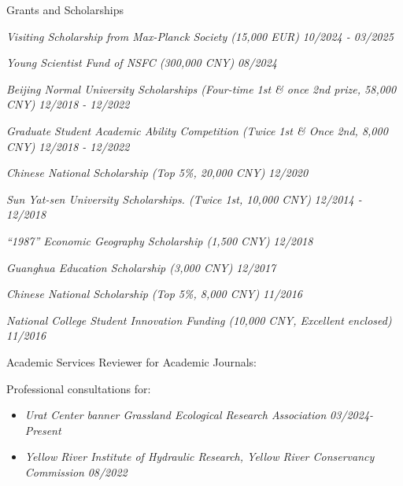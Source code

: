 \documentclass{resume} %
\newcommand{\awardentry}[3]{\textnormal{ \textit {#1}  \hfill {\em #2} #3}}
\begin{document}
\begin{rSection}{Grants and Scholarships}

    \awardentry{Visiting Scholarship from Max-Planck Society (15,000 EUR)}{10/2024 - 03/2025}{}

    \awardentry{Young Scientist Fund of NSFC (300,000 CNY)}{08/2024}{}

    \awardentry{Beijing Normal University Scholarships (Four-time 1st \& once 2nd prize, 58,000 CNY)}{12/2018 - 12/2022}{}

    \awardentry{Graduate Student Academic Ability Competition (Twice 1st \& Once 2nd, 8,000 CNY)}{12/2018 - 12/2022}{}

    \awardentry{Chinese National Scholarship (Top 5\%, 20,000 CNY)}{12/2020}{}

    \awardentry{Sun Yat-sen University Scholarships. (Twice 1st, 10,000 CNY)}{12/2014 - 12/2018}{}

    \awardentry{``1987'' Economic Geography Scholarship (1,500 CNY)}{12/2018}{}

    \awardentry{Guanghua Education Scholarship (3,000 CNY)}{12/2017}{}

    \awardentry{Chinese National Scholarship (Top 5\%, 8,000 CNY)}{11/2016}{}

    \awardentry{National College Student Innovation Funding (10,000 CNY, Excellent enclosed)}{11/2016}{}

\end{rSection}

\begin{rSection}{Academic Services}
    Reviewer for Academic Journals:

    

    \vspace{0.6em}
    Professional consultations for:
\begin{itemize}
    \item \awardentry{Urat Center banner Grassland Ecological Research Association}{03/2024-Present}{}

    \item \awardentry{Yellow River Institute of Hydraulic Research, Yellow River Conservancy Commission}{08/2022}{}

\end{itemize}
\end{rSection}
\end{document}
